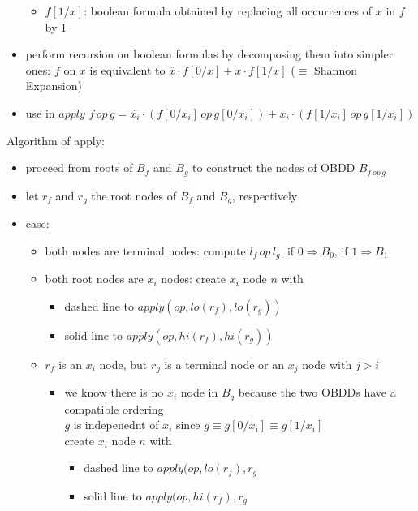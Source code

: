 \documentclass[a4paper, 10pt]{article}
\begin{document}
\begin{mdframed}
\begin{itemize}
\begin{itemize}
        \item $f[1/x]$: boolean formula obtained by replacing all occurrences of $x$ in $f$ by $1$
    \end{itemize}
    \item perform recursion on boolean formulas by decomposing them into simpler ones: $f$ on $x$ is equivalent to $\overline{x}\cdot f[0/x]+x\cdot f[1/x]$ {\tiny ($\equiv$ Shannon Expansion)}
    \item use in $apply$
    $f\,op\,g = \overline{x_i}\cdot(f[0/x_i]\,op\,g[0/x_i])+x_i\cdot(f[1/x_i]\,op\,g[1/x_i])$
\end{itemize}
Algorithm of apply:
\begin{itemize}
    \item proceed from roots of $B_f$ and $B_g$ to construct the nodes of OBDD $B_{f\,op\,g}$
    \item let $r_f$ and $r_g$ the root nodes of $B_f$ and $B_g$, respectively
    \item case:
    \begin{itemize}
        \item both nodes are terminal nodes: compute $l_f\,op\,l_g$, if $0\Rightarrow B_0$, if $1\Rightarrow B_1$
        \item both root nodes are $x_i$ nodes: create $x_i$ node $n$ with
        \begin{itemize}
            \item dashed line to $apply(op,lo(r_f),lo(r_g))$
            \item solid line to $apply(op,hi(r_f),hi(r_g))$
        \end{itemize}
        \item $r_f$ is an $x_i$ node, but $r_g$ is a terminal node or an $x_j$ node with $j>i$
        \begin{itemize}
            \item we know there is no $x_i$ node in $B_g$ because the two OBDDs have a compatible ordering \\
            \follows $g$ is indepenednt of $x_i$ since $g\equiv g[0/x_i]\equiv g[1/x_i]$ \\
            \follows create $x_i$ node $n$ with
            \begin{itemize}
                \item dashed line to $apply(op,lo(r_f),r_g$
                \item solid line to $apply(op,hi(r_f),r_g$
            \end{itemize}
        \end{itemize}

\end{itemize}
\end{itemize}
\end{mdframed}
\end{document}
